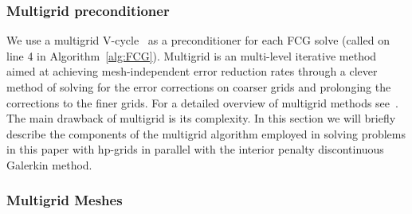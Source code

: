 \subsubsection{Multigrid preconditioner}


We use a multigrid V-cycle~\cite{briggs2000multigrid} as a preconditioner for each
FCG solve (called on line 4 in Algorithm~\ref{alg:FCG}). 
Multigrid is an multi-level iterative method aimed at achieving
mesh-independent error reduction rates through a clever method of
solving for the error corrections on coarser grids and prolonging the
corrections to the finer grids. For a detailed overview of multigrid
methods see~\cite{briggs2000multigrid}. The main drawback of multigrid
is its complexity. In this section we will briefly describe the
components of the multigrid algorithm employed in solving problems in
this paper with hp-grids in parallel with the interior penalty
discontinuous Galerkin method.

\subsubsection{Multigrid Meshes}
\label{sec:MultigridMeshes}

